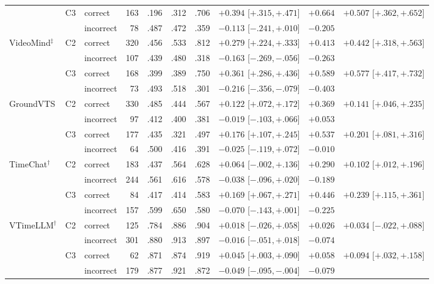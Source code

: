 \begin{table}[t]
\begin{tabular}{lllrrrrlrl}
 & C3 & correct & 163 & .196 & .312 & .706 & $+0.394$ [$+.315,+.471$] & $+0.664$ & $+0.507$ [$+.362,+.652$] \\
 &  & incorrect & 78 & .487 & .472 & .359 & $-0.113$ [$-.241,+.010$] & $-0.205$ &  \\
\addlinespace
VideoMind$^{\ddagger}$ & C2 & correct & 320 & .456 & .533 & .812 & $+0.279$ [$+.224,+.333$] & $+0.413$ & $+0.442$ [$+.318,+.563$] \\
 &  & incorrect & 107 & .439 & .480 & .318 & $-0.163$ [$-.269,-.056$] & $-0.263$ &  \\
 & C3 & correct & 168 & .399 & .389 & .750 & $+0.361$ [$+.286,+.436$] & $+0.589$ & $+0.577$ [$+.417,+.732$] \\
 &  & incorrect & 73 & .493 & .518 & .301 & $-0.216$ [$-.356,-.079$] & $-0.403$ &  \\
\addlinespace
GroundVTS & C2 & correct & 330 & .485 & .444 & .567 & $+0.122$ [$+.072,+.172$] & $+0.369$ & $+0.141$ [$+.046,+.235$] \\
 &  & incorrect & 97 & .412 & .400 & .381 & $-0.019$ [$-.103,+.066$] & $+0.053$ &  \\
 & C3 & correct & 177 & .435 & .321 & .497 & $+0.176$ [$+.107,+.245$] & $+0.537$ & $+0.201$ [$+.081,+.316$] \\
 &  & incorrect & 64 & .500 & .416 & .391 & $-0.025$ [$-.119,+.072$] & $-0.010$ &  \\
\addlinespace
TimeChat$^{\dagger}$ & C2 & correct & 183 & .437 & .564 & .628 & $+0.064$ [$-.002,+.136$] & $+0.290$ & $+0.102$ [$+.012,+.196$] \\
 &  & incorrect & 244 & .561 & .616 & .578 & $-0.038$ [$-.096,+.020$] & $-0.189$ &  \\
 & C3 & correct & 84 & .417 & .414 & .583 & $+0.169$ [$+.067,+.271$] & $+0.446$ & $+0.239$ [$+.115,+.361$] \\
 &  & incorrect & 157 & .599 & .650 & .580 & $-0.070$ [$-.143,+.001$] & $-0.225$ &  \\
\addlinespace
VTimeLLM$^{\dagger}$ & C2 & correct & 125 & .784 & .886 & .904 & $+0.018$ [$-.026,+.058$] & $+0.026$ & $+0.034$ [$-.022,+.088$] \\
 &  & incorrect & 301 & .880 & .913 & .897 & $-0.016$ [$-.051,+.018$] & $-0.074$ &  \\
 & C3 & correct & 62 & .871 & .874 & .919 & $+0.045$ [$+.003,+.090$] & $+0.058$ & $+0.094$ [$+.032,+.158$] \\
 &  & incorrect & 179 & .877 & .921 & .872 & $-0.049$ [$-.095,-.004$] & $-0.079$ &  \\
\bottomrule
\end{tabular}
\end{table}
